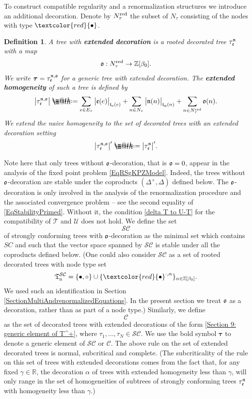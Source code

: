\documentclass[10pt, reqno]{amsart}
\makeatletter
\numberwithin{subsection}{section}
\numberwithin{subsubsection}{subsection}
\numberwithin{equation}{section} %
\theoremstyle{mystyle}
\theoremstyle{mystyle2}
\newtheorem*{defn*} {Definition}
\theoremstyle{mystyle3}
\newcommand{\bstau}{\boldsymbol{\tau}}
\newcommand{\ssk}{\smallskip}
\newcommand\bbR{\mathbb{R}}
\newcommand\bbZ{\mathbb{Z}}
\newcommand{\mcC}{\mathcal{C}}
\newcommand\mcS{\mathcal{S}}
\newcommand*{\defeq}{\mathrel{\rlap{%
                     \raisebox{0.3ex}{$\m@th\cdot$}}%
                     \raisebox{-0.3ex}{$\m@th\cdot$}}%
                     =}
\makeatother
\begin{document}
\ssk

To construct compatible regularity and a renormalization structures we introduce an additional decoration. Denote by $N_\tau^{\text{\rm red}}$ the 
subset of $N_\tau$ consisting of the nodes with type $\textcolor{red}{\bullet}$.

\ssk

\begin{defn*}
A tree with \textbf{\textsf{extended decoration}} is a rooted decorated tree $\tau_{\frak{e}}^{\frak{n}}$ with a map
$$
\frak{o}:N^{{\rm red}}_\tau\to\bbZ[\beta_0].
$$
We write $\bstau=\tau_{\frak{e}}^{\frak{n},\frak{o}}$ for a generic tree with extended decoration.
The \textbf{\textsf{extended homogeneity}} of such a tree is defined by
$$
\big|\tau_{\frak{e}}^{\frak{n},\frak{o}}\big| \defeq  \sum_{e\in E_\tau} \big|\frak{e}(e)\big|_{\frak{t}_{\rm e}(e)} + \sum_{n\in N_\tau} \big|\frak{n}(n)\big|_{\frak{t}_{\rm n}(n)}+ \sum_{n\in N_\tau^{\rm red}}\frak{o}(n).
$$
We extend the naive homogeneity to the set of decorated trees with an extended decoration setting
$$
\big|\tau_{\frak{e}}^{\frak{n},\frak{o}}\big|' \defeq  \big|\tau_{\frak{e}}^{\frak{n}}\big|'.
$$   
\end{defn*}

\ssk

Note here that only trees without $\frak{o}$-decoration, that is $\frak{o}=0$, appear in the analysis of the fixed point problem \eqref{EqRSgKPZModel}. Indeed, the trees without $\frak{o}$-decoration are stable under the coproducts $(\Delta^+,\Delta)$ defined below.
The $\frak{o}$-decoration is only involved in the analysis of the renormalization procedure and the associated convergence problem -- see the second equality of \eqref{EqStabilityPrimed}. Without it, the condition \eqref{delta T to U-T} for the compatibility of $\mathscr{T}$ and $\mathscr{U}$ does not hold. We define the set
$$
\mathcal{SC}
$$
of strongly conforming trees with $\frak{o}$-decoration as the minimal set which contains $SC$ and 
such that the vector space spanned by $\mathcal{SC}$
is stable under all the coproducts defined below. (One could also consider $\mathcal{SC}$ as a set of rooted decorated trees with node type set
$$
\frak{T}_{\rm n}^{\mcS\mcC}=\{\bullet,\circ\}\cup\{\textcolor{red}{\bullet}^{\cdot,\alpha}\}_{\alpha\in\bbZ[\beta_0]}.
$$
We used such an identification in Section \ref{SectionMultiAndrenormalizedEquations}. In the present section we treat $\frak{o}$ as a decoration, rather than as part of a node type.) Similarly, we define
$$
\mcC
$$
as the set of decorated trees with extended decorations of the form \eqref{Section 9: generic element of T^+}, where $\tau_1,\dots,\tau_N\in\mcS\mcC$. We use the bold symbol $\bstau$ to denote a generic element of $\mathcal{SC}$ or $\mcC$. The above rule on the set of extended decorated trees is normal, subcritical and complete. (The subcriticality of the rule on 
this set of trees with extended decorations comes from the fact that, for 
any fixed $\gamma\in\bbR$, the decoration $\alpha$ of trees with extended 
homogeneity less than $\gamma$, will only range in the set of homogeneities of subtrees of strongly conforming trees $\tau_{\frak{e}}^{\frak{n}}$ with homogeneity less than $\gamma$.) 
\end{document}
